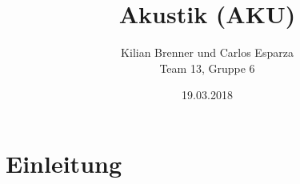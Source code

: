 \documentclass[12pt,a4paper]{article}
\title{Akustik (AKU)}
\author{Kilian Brenner und Carlos Esparza \\ Team 13, Gruppe 6}
\date{19.03.2018}
\begin{document}
\maketitle
\tableofcontents
\newpage

\section{Einleitung}











% 
\end{document}
